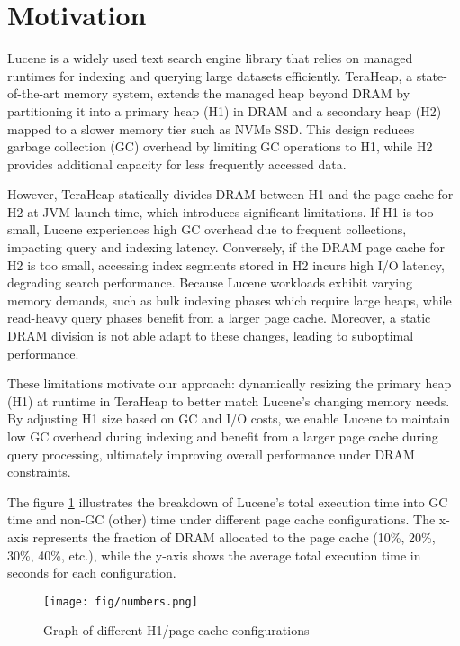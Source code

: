 \section{Motivation}
Lucene is a widely used text search engine library that relies on managed runtimes for indexing and querying large datasets efficiently. TeraHeap, a state-of-the-art memory system, extends the managed heap beyond DRAM by partitioning it into a primary heap (H1) in DRAM and a secondary heap (H2) mapped to a slower memory tier such as NVMe SSD. This design reduces garbage collection (GC) overhead by limiting GC operations to H1, while H2 provides additional capacity for less frequently accessed data.

However, TeraHeap statically divides DRAM between H1 and the page cache for H2 at JVM launch time, which introduces significant limitations. If H1 is too small, Lucene experiences high GC overhead due to frequent collections, impacting query and indexing latency. Conversely, if the DRAM page cache for H2 is too small, accessing index segments stored in H2 incurs high I/O latency, degrading search performance. Because Lucene workloads exhibit varying memory demands, such as bulk indexing phases which require large heaps, while read-heavy query phases benefit from a larger page cache. Moreover, a static DRAM division is not able adapt to these changes, leading to suboptimal performance.

These limitations motivate our approach: dynamically resizing the primary heap (H1) at runtime in TeraHeap to better match Lucene’s changing memory needs. By adjusting H1 size based on GC and I/O costs, we enable Lucene to maintain low GC overhead during indexing and benefit from a larger page cache during query processing, ultimately improving overall performance under DRAM constraints.

The figure \ref{fig:graph} illustrates the breakdown of Lucene’s total execution time into GC time and non-GC (other) time under different page cache configurations. The x-axis represents the fraction of DRAM allocated to the page cache (10\%, 20\%, 30\%, 40\%, etc.), while the y-axis shows the average total execution time in seconds for each configuration.

\begin{figure}[htbp]
  \centering
  \texttt{[image: fig/numbers.png]}
  \caption{Graph of different H1/page cache configurations}
  \label{fig:graph}
\end{figure}

